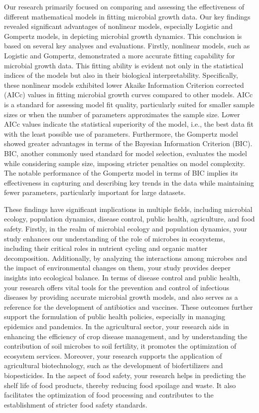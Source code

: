 \documentclass[11pt]{article}
\begin{document}
\begin{linenumbers}
Our research primarily focused on comparing and assessing the effectiveness of different mathematical models in fitting microbial growth data. Our key findings revealed significant advantages of nonlinear models, especially Logistic and Gompertz models, in depicting microbial growth dynamics. This conclusion is based on several key analyses and evaluations. Firstly, nonlinear models, such as Logistic and Gompertz, demonstrated a more accurate fitting capability for microbial growth data. This fitting ability is evident not only in the statistical indices of the models but also in their biological interpretability. Specifically, these nonlinear models exhibited lower Akaike Information Criterion corrected (AICc) values in fitting microbial growth curves compared to other models. AICc is a standard for assessing model fit quality, particularly suited for smaller sample sizes or when the number of parameters approximates the sample size. Lower AICc values indicate the statistical superiority of the model, i.e., the best data fit with the least possible use of parameters. Furthermore, the Gompertz model showed greater advantages in terms of the Bayesian Information Criterion (BIC). BIC, another commonly used standard for model selection, evaluates the model while considering sample size, imposing stricter penalties on model complexity. The notable performance of the Gompertz model in terms of BIC implies its effectiveness in capturing and describing key trends in the data while maintaining fewer parameters, particularly important for large datasets.

These findings have significant implications in multiple fields, including microbial ecology, population dynamics, disease control, public health, agriculture, and food safety. Firstly, in the realm of microbial ecology and population dynamics, your study enhances our understanding of the role of microbes in ecosystems, including their critical roles in nutrient cycling and organic matter decomposition. Additionally, by analyzing the interactions among microbes and the impact of environmental changes on them, your study provides deeper insights into ecological balance. In terms of disease control and public health, your research offers vital tools for the prevention and control of infectious diseases by providing accurate microbial growth models, and also serves as a reference for the development of antibiotics and vaccines. These outcomes further support the formulation of public health policies, especially in managing epidemics and pandemics. In the agricultural sector, your research aids in enhancing the efficiency of crop disease management, and by understanding the contribution of soil microbes to soil fertility, it promotes the optimization of ecosystem services. Moreover, your research supports the application of agricultural biotechnology, such as the development of biofertilizers and biopesticides. In the aspect of food safety, your research helps in predicting the shelf life of food products, thereby reducing food spoilage and waste. It also facilitates the optimization of food processing and contributes to the establishment of stricter food safety standards.


\end{linenumbers}
\end{document}
